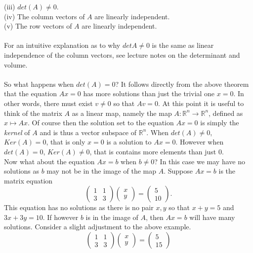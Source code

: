 \documentclass{amsart}
\begin{document}
(iii) $det(A)\neq 0$.\\
(iv) The column vectors of $A$ are linearly independent.\\
(v) The row vectors of $A$ are linearly independent.\\
\\
For an intuitive explanation as to why $det A\neq 0$ is the same as linear independence of the column vectors, see lecture notes on the determinant and volume.\\
\\
So what happens when $det(A)=0$? It follows directly from the above theorem that the equation $Ax=0$ has more solutions than just the trivial one $x=0$. In other words, there must exist $v\neq 0$ so that $Av=0$.  At this point it is useful to think of the matrix $A$ as a linear map, namely the map $A:\mathbb{R}^{n}\rightarrow\mathbb{R}^{n}$, defined as $x\mapsto Ax$. Of course then the solution set to the equation $Ax=0$ is simply the {\it kernel} of $A$ and is thus a vector subspace of $\mathbb{R}^{n}$. When $det(A)\neq 0$, $Ker(A)=0$, that is only $x=0$ is a solution to $Ax=0$. However when $det(A)=0$, $Ker(A)\neq0$, that is contains more elements than just $0$.\\
Now what about the equation $Ax=b$ when $b\neq0$? In this case we may have no solutions as $b$ may not be in the image of the map $A$. Suppose $Ax=b$ is the matrix equation
\begin{equation*}
 \begin{pmatrix}
 1&1\\
 3&3
 \end{pmatrix}
 \begin{pmatrix}
 x\\
 y
 \end{pmatrix}
= 
\begin{pmatrix}
 5\\
 10
 \end{pmatrix}.
 \end{equation*}
 This equation has no solutions as there is no pair $x,y$ so that $x+y=5$ and $3x+3y=10$.
 If however $b$ is in the image of $A$, then $Ax=b$ will have many solutions. Consider a slight adjustment to the above example.
 \begin{equation*}
 \begin{pmatrix}
 1&1\\
 3&3
 \end{pmatrix}
 \begin{pmatrix}
 x\\
 y
 \end{pmatrix}
= 
\begin{pmatrix}
 5\\
 15
 \end{pmatrix}
 \end{equation*}
\end{document}
